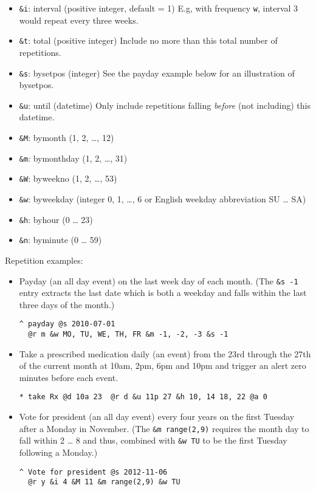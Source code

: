 \documentclass[]{article}
\begin{document}
\begin{itemize}
\item
  \texttt{\&i}: interval (positive integer, default = 1) E.g, with
  frequency \texttt{w}, interval 3 would repeat every three weeks.
\item
  \texttt{\&t}: total (positive integer) Include no more than this total
  number of repetitions.
\item
  \texttt{\&s}: bysetpos (integer) See the payday example below for an
  illustration of bysetpos.
\item
  \texttt{\&u}: until (datetime) Only include repetitions falling
  \emph{before} (not including) this datetime.
\item
  \texttt{\&M}: bymonth (1, 2, \ldots{}, 12)
\item
  \texttt{\&m}: bymonthday (1, 2, \ldots{}, 31)
\item
  \texttt{\&W}: byweekno (1, 2, \ldots{}, 53)
\item
  \texttt{\&w}: byweekday (integer 0, 1, \ldots{}, 6 or English weekday
  abbreviation SU \ldots{} SA)
\item
  \texttt{\&h}: byhour (0 \ldots{} 23)
\item
  \texttt{\&n}: byminute (0 \ldots{} 59)
\end{itemize}

Repetition examples:

\begin{itemize}
\item
  Payday (an all day event) on the last week day of each month. (The
  \texttt{\&s -1} entry extracts the last date which is both a weekday
  and falls within the last three days of the month.)

\begin{verbatim}
^ payday @s 2010-07-01
  @r m &w MO, TU, WE, TH, FR &m -1, -2, -3 &s -1
\end{verbatim}
\item
  Take a prescribed medication daily (an event) from the 23rd through
  the 27th of the current month at 10am, 2pm, 6pm and 10pm and trigger
  an alert zero minutes before each event.

\begin{verbatim}
* take Rx @d 10a 23  @r d &u 11p 27 &h 10, 14 18, 22 @a 0
\end{verbatim}
\item
  Vote for president (an all day event) every four years on the first
  Tuesday after a Monday in November. (The \texttt{\&m range(2,9)}
  requires the month day to fall within 2 \ldots{} 8 and thus, combined
  with \texttt{\&w TU} to be the first Tuesday following a Monday.)

\begin{verbatim}
^ Vote for president @s 2012-11-06
  @r y &i 4 &M 11 &m range(2,9) &w TU
\end{verbatim}
\end{itemize}
\end{document}
